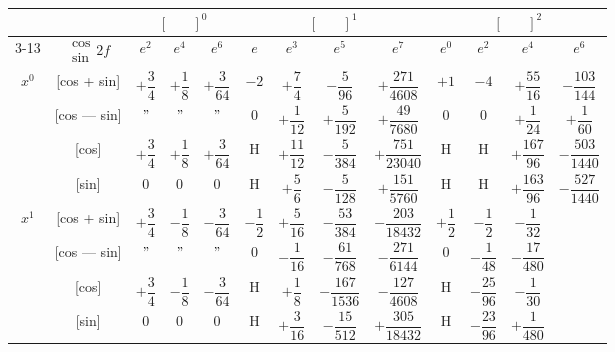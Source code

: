 \documentclass[11pt,a4paper]{book}
\begin{document}
{{\vspace{1em}


\begin{center}
\small
\begin{tabular}{|c|c|c|c|c|c|c|c|c|c|c|c|c|}
\hline
& & \multicolumn{3}{c|}{$[\phantom{()}]^0$} & \multicolumn{4}{c|}{$[\phantom{()}]^1$} & \multicolumn{4}{c|}{$[\phantom{()}]^2$} \\
\cline{3-13}
& $\begin{smallmatrix} \cos \\ \sin \end{smallmatrix} 2f$ & $e^2$ & $e^4$ & $e^6$ & $e$ & $e^3$ & $e^5$ & $e^7$ & $e^0$ & $e^2$ & $e^4$ & $e^6$ \\
\hline
\multirow{4}{*}{$x^0$} & [cos + sin] & $+\dfrac{3}{4}$ & $+\dfrac{1}{8}$ & $+\dfrac{3}{64}$ & $-2$ & $+\dfrac{7}{4}$ & $-\dfrac{5}{96}$ & $+\dfrac{271}{4608}$ & $+1$ & $-4$ & $+\dfrac{55}{16}$ & $-\dfrac{103}{144}$ \\
& [cos --- sin] & $"$ & $"$ & $"$ & $0$ & $+\dfrac{1}{12}$ & $+\dfrac{5}{192}$ & $+\dfrac{49}{7680}$ & $0$ & $0$ & $+\dfrac{1}{24}$ & $+\dfrac{1}{60}$ \\
& [cos] & $+\dfrac{3}{4}$ & $+\dfrac{1}{8}$ & $+\dfrac{3}{64}$ & H & $+\dfrac{11}{12}$ & $-\dfrac{5}{384}$ & $+\dfrac{751}{23040}$ & H & H & $+\dfrac{167}{96}$ & $-\dfrac{503}{1440}$ \\
& [sin] & $0$ & $0$ & $0$ & H & $+\dfrac{5}{6}$ & $-\dfrac{5}{128}$ & $+\dfrac{151}{5760}$ & H & H & $+\dfrac{163}{96}$ & $-\dfrac{527}{1440}$ \\
\hline
\multirow{4}{*}{$x^1$} & [cos + sin] & $+\dfrac{3}{4}$ & $-\dfrac{1}{8}$ & $-\dfrac{3}{64}$ & $-\dfrac{1}{2}$ & $+\dfrac{5}{16}$ & $-\dfrac{53}{384}$ & $-\dfrac{203}{18432}$ & $+\dfrac{1}{2}$ & $-\dfrac{1}{2}$ & $-\dfrac{1}{32}$ \\
& [cos --- sin] & $"$ & $"$ & $"$ & $0$ & $-\dfrac{1}{16}$ & $-\dfrac{61}{768}$ & $-\dfrac{271}{6144}$ & $0$ & $-\dfrac{1}{48}$ & $-\dfrac{17}{480}$ \\
& [cos] & $+\dfrac{3}{4}$ & $-\dfrac{1}{8}$ & $-\dfrac{3}{64}$ & H & $+\dfrac{1}{8}$ & $-\dfrac{167}{1536}$ & $-\dfrac{127}{4608}$ & H & $-\dfrac{25}{96}$ & $-\dfrac{1}{30}$ \\
& [sin] & $0$ & $0$ & $0$ & H & $+\dfrac{3}{16}$ & $-\dfrac{15}{512}$ & $+\dfrac{305}{18432}$ & H & $-\dfrac{23}{96}$ & $+\dfrac{1}{480}$ \\

\end{tabular}
\end{center}}}
\end{document}
